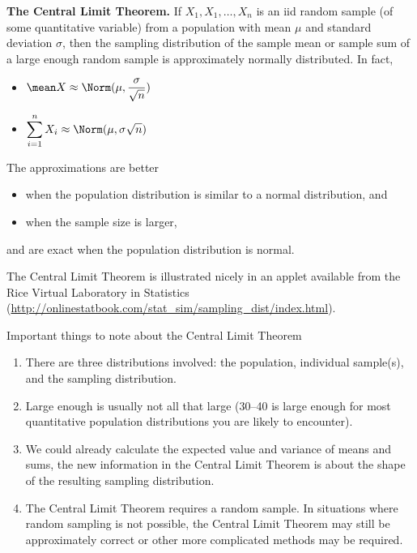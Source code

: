 \documentclass[twoside]{book}\usepackage[]{graphicx}\usepackage[]{xcolor}
\newlength{\tempfmlength}
\newenvironment{fmpage}[1]
     {
	 \medskip
	 \setlength{\tempfmlength}{#1}
	 \begin{lrbox}{\fmbox}
	   \begin{minipage}{#1}
		 \vspace*{.02\tempfmlength}
		 \hfill
	   \begin{minipage}{.95 \tempfmlength}}
		 {\end{minipage}\hfill
		 \vspace*{.015\tempfmlength}
		 \end{minipage}\end{lrbox}\fbox{\usebox{\fmbox}}
	 \medskip
	 }
\newenvironment{boxedText}[1][.98\textwidth]%
{%
\begin{center}
\begin{fmpage}{#1}
}%
{%
\end{fmpage}
\end{center}
}
\begin{document}
\begin{boxedText}
{\sf \bfseries The Central Limit Theorem.}
If $X_1, X_1, \dots, X_n$ is an iid random sample (of some quantitative variable) 
from a population with mean $\mu$ and standard deviation $\sigma$,
then the sampling distribution of the sample mean or sample sum 
of a large enough random sample is approximately normally distributed.  In fact,
\medskip

\begin{itemize}
\item $\displaystyle \mean X \approx \Norm(\mu, \frac{\sigma}{\sqrt{n}}) $
\item $\displaystyle \sum_{i = 1}^{n} X_i \approx \Norm(\mu, {\sigma}{\sqrt{n}}) $
\end{itemize}
\medskip

The approximations are better 
\begin{itemize}
\item
when the population distribution is similar to a normal distribution, and 
\item
when the sample size is larger,
\end{itemize}
and are exact when the population distribution is normal.

\medskip
The Central Limit Theorem is illustrated nicely in an applet available 
from the Rice Virtual Laboratory in Statistics
(\url{http://onlinestatbook.com/stat_sim/sampling_dist/index.html}).
\end{boxedText}

Important things to note about the Central Limit Theorem
\begin{enumerate}
	\item
		There are three distributions involved: the population, individual sample(s),
		and the sampling distribution.
	\item
		Large enough is usually not all that large (30--40 is large enough for 
		most quantitative population distributions you are likely to encounter).
	\item
		We could already calculate the expected value and variance of means
		and sums, the new information in the Central Limit Theorem is about the
		shape of the resulting sampling distribution.
	\item
		The Central Limit Theorem requires a random sample.  In situations where
		random sampling is not possible, the Central Limit Theorem may still be 
		approximately correct or other more complicated methods may be required.
\end{enumerate}
\end{document}
